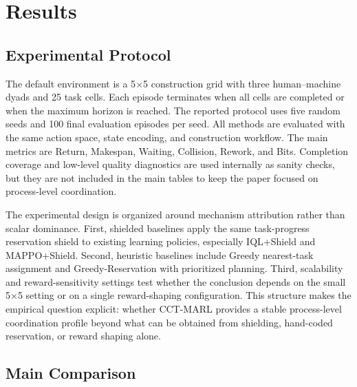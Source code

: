 \documentclass[fleqn,10pt]{wlpeerj}
\begin{document}

\section{Results}

\subsection{Experimental Protocol}

The default environment is a 5$\times$5 construction grid with three human--machine dyads and 25 task cells. Each episode terminates when all cells are completed or when the maximum horizon is reached. The reported protocol uses five random seeds and 100 final evaluation episodes per seed. All methods are evaluated with the same action space, state encoding, and construction workflow. The main metrics are Return, Makespan, Waiting, Collision, Rework, and Bits. Completion coverage and low-level quality diagnostics are used internally as sanity checks, but they are not included in the main tables to keep the paper focused on process-level coordination.

The experimental design is organized around mechanism attribution rather than scalar dominance. First, shielded baselines apply the same task-progress reservation shield to existing learning policies, especially IQL+Shield and MAPPO+Shield. Second, heuristic baselines include Greedy nearest-task assignment and Greedy-Reservation with prioritized planning. Third, scalability and reward-sensitivity settings test whether the conclusion depends on the small 5$\times$5 setting or on a single reward-shaping configuration. This structure makes the empirical question explicit: whether CCT-MARL provides a stable process-level coordination profile beyond what can be obtained from shielding, hand-coded reservation, or reward shaping alone.

\subsection{Main Comparison}
\end{document}
